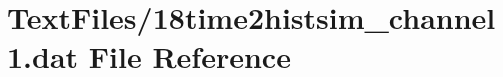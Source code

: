 \hypertarget{18time2histsim__channel1_8dat}{}\section{Text\+Files/18time2histsim\+\_\+channel1.dat File Reference}
\label{18time2histsim__channel1_8dat}
